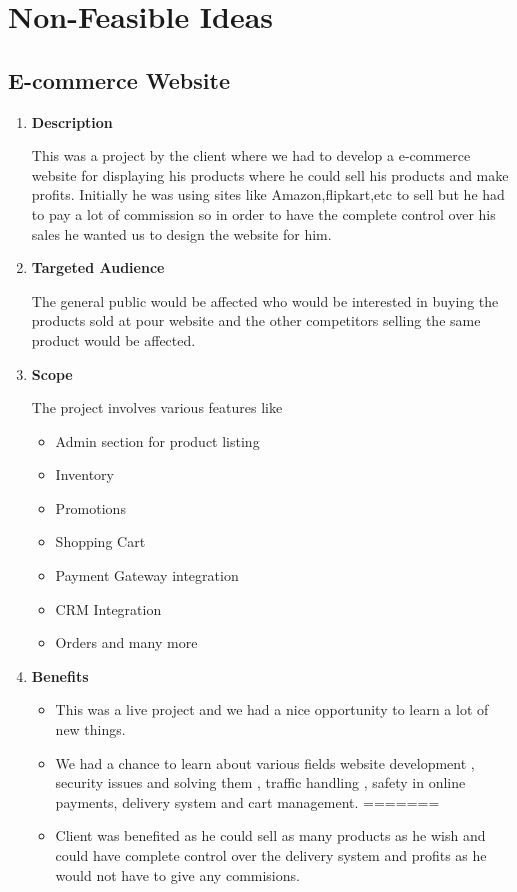 \documentclass[fleqn,10pt]{../SelfArx} %
\begin{document}

\section{Non-Feasible Ideas}
\subsection{E-commerce Website}
\vspace{0.5cm}
\begin{enumerate}
\item \textbf{Description}

This was a project by the client where we had to develop a e-commerce website for displaying his products where he could sell his products and make profits. Initially he was using sites like Amazon,flipkart,etc to sell but he had to pay a lot of commission so in order to have the complete control over his sales he wanted us to design the website for him.

\item \textbf{Targeted Audience}

The general public would be affected who would be interested in buying the products sold at pour website and the other competitors selling the same product would be affected.

\item \textbf{Scope}

The project involves various features like
\begin{itemize}
    \item Admin section for product listing \item Inventory \item Promotions  \item Shopping Cart \item  Payment Gateway integration \item  CRM Integration \item  Orders and many more
\end{itemize}


 \item \textbf{Benefits}
 
\begin{itemize}

    \item This was a live project and we had a nice opportunity to learn a lot of new things.
    \item We had a chance to learn about various fields website development , security issues and solving them , traffic handling , safety in online payments, delivery system and cart management.
=======
 \item Client was benefited as he could sell as many products as he wish and could have complete control over the delivery system and profits as he would not have to give any commisions.
\end{itemize}


\end{enumerate}
\end{document}
